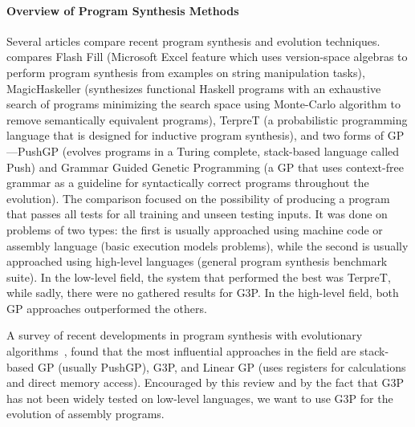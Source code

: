 \documentclass[dvipsnames, format=sigconf]{acmart}
\begin{document}
\paragraph{Overview of Program Synthesis Methods} 
Several articles compare recent program synthesis and evolution techniques.
\cite{Pantridge2017On} compares Flash Fill (Microsoft Excel feature which uses version-space algebras to perform program synthesis from examples on string manipulation tasks), MagicHaskeller (synthesizes functional Haskell programs with an exhaustive search of programs minimizing the search space using Monte-Carlo algorithm to remove semantically equivalent programs), TerpreT (a probabilistic programming language that is designed for inductive program synthesis), and two forms of GP---PushGP (evolves programs in a Turing complete, stack-based language called Push) and Grammar Guided Genetic Programming (a GP that uses context-free grammar as a guideline for syntactically correct programs throughout the evolution). The comparison focused on the possibility of producing a program that passes all tests for all training and unseen testing inputs. It was done on problems of two types: the first is usually approached using machine code or assembly language (basic execution models problems), while the second is usually approached using high-level languages (general program synthesis benchmark suite). In the low-level field, the system that performed the best was TerpreT, while sadly, there were no gathered results for G3P. In the high-level field, both GP approaches outperformed the others.

A survey of recent developments in program synthesis with evolutionary algorithms~\cite{domonik2021recent}, found that the most influential approaches in the field are stack-based GP (usually PushGP), G3P, and Linear GP (uses registers for calculations and direct memory access).
Encouraged by this review and by the fact that G3P has not been widely tested on low-level languages, we want to use G3P for the evolution of assembly programs.

\end{document}
